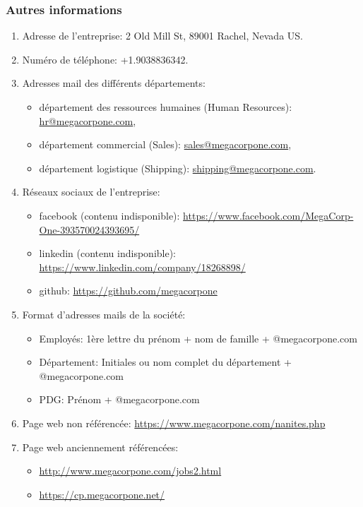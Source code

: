 \documentclass[french,paper=a4,oneside,captions=tableheading]{article}
\begin{document}
\subsubsection{Autres informations}

\begin{enumerate}
    \item Adresse de l'entreprise: 2 Old Mill St, 89001 Rachel, Nevada US.
    \item Numéro de téléphone: +1.9038836342.
    \item Adresses mail des différents départements:
    \begin{itemize}
        \item département des ressources humaines (Human Resources): \url{hr@megacorpone.com},
        \item département commercial (Sales): \url{sales@megacorpone.com},
        \item département logistique (Shipping): \url{shipping@megacorpone.com}.
    \end{itemize}
    \item Réseaux sociaux de l'entreprise:
    \begin{itemize}
        \item facebook (contenu indisponible): \url{https://www.facebook.com/MegaCorp-One-393570024393695/}
        \item linkedin (contenu indisponible): \url{https://www.linkedin.com/company/18268898/}
        \item github: \url{https://github.com/megacorpone}
    \end{itemize}
    \item Format d'adresses mails de la société:
    \begin{itemize}
        \item Employés: 1ère lettre du prénom + nom de famille + @megacorpone.com
        \item Département: Initiales ou nom complet du département + @megacorpone.com
        \item PDG: Prénom + @megacorpone.com
    \end{itemize}
    \item Page web non référencée: \url{https://www.megacorpone.com/nanites.php}
    \item Page web anciennement référencées:
    \begin{itemize}
        \item \url{http://www.megacorpone.com/jobs2.html}
        \item \url{https://cp.megacorpone.net/}
    \end{itemize}
\end{enumerate}
\end{document}
